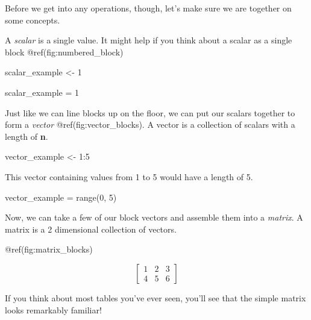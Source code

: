 \documentclass[
  letterpaper,
]{krantz}
\newenvironment{Shaded}{}{}
\newcommand{\BuiltInTok}[1]{\textcolor[rgb]{0.00,0.50,0.00}{#1}}
\newcommand{\DecValTok}[1]{\textcolor[rgb]{0.25,0.63,0.44}{#1}}
\newcommand{\NormalTok}[1]{#1}
\newcommand{\OperatorTok}[1]{\textcolor[rgb]{0.40,0.40,0.40}{#1}}
\newcommand{\OtherTok}[1]{\textcolor[rgb]{0.00,0.44,0.13}{#1}}
\newcommand{\SpecialCharTok}[1]{\textcolor[rgb]{0.25,0.44,0.63}{#1}}
\begin{document}
Before we get into any operations, though, let's make sure we are
together on some concepts.

A \emph{scalar} is a single value. It might help if you think about a
scalar as a single block @ref(fig:numbered\_block)

\begin{Shaded}
\begin{Highlighting}[]
\NormalTok{scalar\_example }\OtherTok{\textless{}{-}} \DecValTok{1}
\end{Highlighting}
\end{Shaded}

\begin{Shaded}
\begin{Highlighting}[]
\NormalTok{scalar\_example }\OperatorTok{=} \DecValTok{1}
\end{Highlighting}
\end{Shaded}

Just like we can line blocks up on the floor, we can put our scalars
together to form a \emph{vector} @ref(fig:vector\_blocks). A vector is a
collection of scalars with a length of \textbf{n}.

\begin{Shaded}
\begin{Highlighting}[]
\NormalTok{vector\_example }\OtherTok{\textless{}{-}} \DecValTok{1}\SpecialCharTok{:}\DecValTok{5}
\end{Highlighting}
\end{Shaded}

This vector containing values from 1 to 5 would have a length of 5.

\begin{Shaded}
\begin{Highlighting}[]
\NormalTok{vector\_example }\OperatorTok{=} \BuiltInTok{range}\NormalTok{(}\DecValTok{0}\NormalTok{, }\DecValTok{5}\NormalTok{)}
\end{Highlighting}
\end{Shaded}

Now, we can take a few of our block vectors and assemble them into a
\emph{matrix}. A matrix is a 2 dimensional collection of vectors.

@ref(fig:matrix\_blocks)

\[
\begin{bmatrix}
1 & 2 & 3\\
4 & 5 & 6
\end{bmatrix}
\]

If you think about most tables you've ever seen, you'll see that the
simple matrix looks remarkably familiar!
\end{document}
